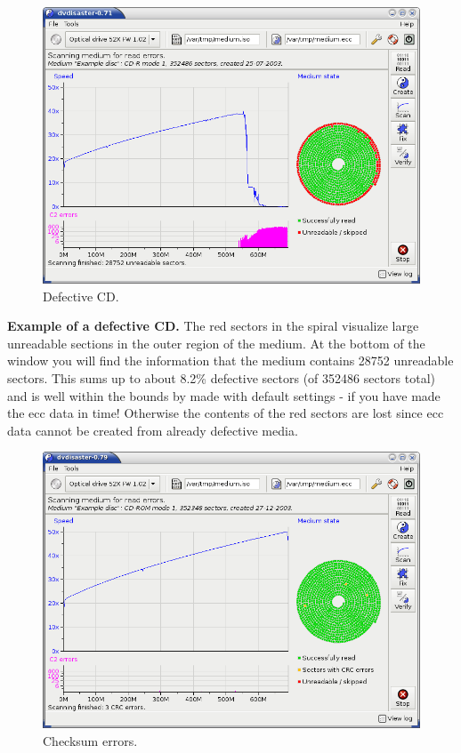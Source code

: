 \newpage
\begin{figure}[h]
\centerline{\includegraphics[width=\textwidth]{screenshots/defective-cd-scan.png}}
\caption{Defective CD.}  
\label{howto-scan-defective-cd}
\end{figure}

{\bf Example of a defective CD.} \label{howto-interpret-defective-cd}
The red sectors in the spiral
visualize large unreadable sections in the outer region of the medium.
At the bottom of the window you will find the information that the
medium contains 28752 unreadable sectors. This sums up to about
8.2\% defective sectors (of 352486 sectors total) and is well within
the  bounds
by  made with default
settings - if you have made the ecc data in time! Otherwise the
contents of the red sectors are lost since ecc data cannot be
created from already defective media.

\newpage
\begin{figure}[h]
\centerline{\includegraphics[width=\textwidth]{screenshots/crc-cd-scan.png}}
\caption{Checksum errors.}  
\label{howto-scan-checksum-errors}
\end{figure}


